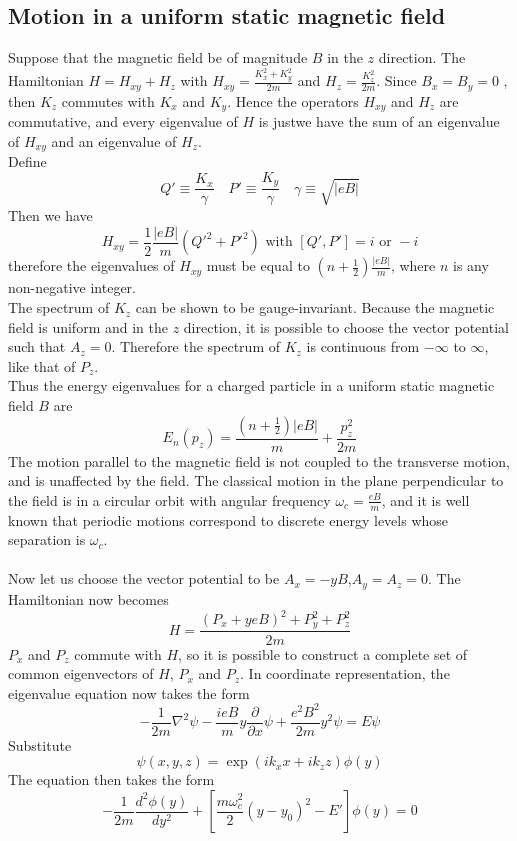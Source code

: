 \subsection{Motion in a uniform static magnetic field} 
Suppose that the magnetic field be of magnitude $B$ in the $z$ direction. The Hamiltonian $H = H_{xy}+H_z$ with $H_{xy} = \frac{K_x^2+K_y^2}{2m}$ and $H_z = \frac{K_z^2}{2m}$. 
Since $B_x = B_y = 0$ , then $K_z$ commutes with $K_x$ and $K_y$. Hence the operators $H_{xy}$ and $H_z$ are commutative, and every eigenvalue of $H$ is justwe have
the sum of an eigenvalue of $H_{xy}$ and an eigenvalue of $H_z$. 
\\
Define
\[Q' \equiv \frac{K_x}{\gamma} \quad P' \equiv \frac{K_y}{\gamma} \quad \gamma \equiv \sqrt{|eB|} \]
Then we have
\[H_{xy} = \frac{1}{2} \frac{|eB|}{m}(Q'^2+P'^2) \mbox{  with  } [Q',P'] = i \mbox{  or  }-i\]
therefore the eigenvalues of $H_{xy}$ must be equal to $(n+\frac{1}{2})\frac{|eB|}{m}$, where $n$ is any non-negative integer.\\
The spectrum of $K_z$ can be shown to be gauge-invariant.
Because the magnetic field is uniform and in the $z$ direction, it is possible to choose the vector potential such that $A_z = 0$. Therefore the spectrum of $K_z$ is
continuous from $-\infty$ to $\infty$, like that of $P_z$.\\
Thus the energy eigenvalues for a charged particle in a uniform static magnetic field $B$ are
\[E_n(p_z) = \frac{(n+\frac{1}{2})|eB|}{m} + \frac{p_z^2}{2m}\]
The motion parallel to the magnetic field is not coupled to the transverse motion, and is unaffected by the field. The classical motion in the plane perpendicular to the field is
in a circular orbit with angular frequency $\omega_c = \frac{eB}{m}$, and it is well known that periodic motions correspond to discrete energy levels whose separation is $\omega_c$.\\ \\
Now let us choose the vector potential to be $A_x=-yB$,$A_y=A_z=0$. The Hamiltonian now becomes
\[H = \frac{(P_x+yeB)^2 + P_y^2 + P_z^2}{2m}\]
$P_x$ and $P_z$ commute with $H$, so it is possible to construct a complete set of common eigenvectors of $H$, $P_x$ and $P_z$. In coordinate representation, the eigenvalue equation now takes the form
\[-\frac{1}{2m}\nabla^2 \psi - \frac{ieB}{m}y\frac{\partial}{\partial x}\psi + \frac{e^2B^2}{2m}y^2\psi = E\psi\]
Substitute
\[\psi(x,y,z) = \exp(ik_xx+ik_zz)\phi(y)\]
The equation then takes the form
\[-\frac{1}{2m} \frac{d^2\phi(y)}{dy^2} + \left[ \frac{m\omega_c^2}{2}(y-y_0)^2-E' \right]\phi(y) = 0\]
